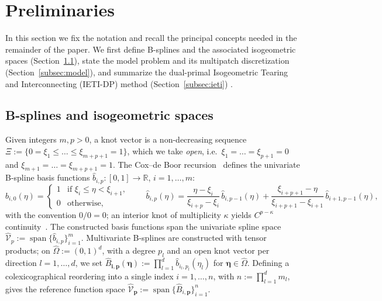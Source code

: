 \documentclass{article}
\newcommand{\vect}[1]{\boldsymbol{#1}}
\newcommand{\R}{\mathbb{R}}
\DeclareMathOperator{\spann}{span}
\newcommand{\refdom}{\widehat{\Omega}}            %
\newcommand{\bsuni}[2]{\widehat{b}_{#1,#2}}      %
\newcommand{\Bref}[2]{\widehat{B}_{#1,#2}}       %
\newcommand{\Shat}[1]{\widehat{\mathcal{V}}_{#1}} %
\theoremstyle{plain}
\numberwithin{equation}{section}
\begin{document}
\section{Preliminaries} \label{sec:preliminaries}

In this section we fix the notation and recall the principal concepts needed in the
remainder of the paper. We first define B-splines and the associated
isogeometric spaces (Section~\ref{subsec:bsplines}), state the model problem and
its multipatch discretization (Section~\ref{subsec:model}), and summarize the
dual-primal Isogeometric Tearing and Interconnecting (IETI-DP) method
(Section~\ref{subsec:ieti}) \cite{kleiss2012ieti}.

\subsection{B-splines and isogeometric spaces} \label{subsec:bsplines}

Given integers $m, p > 0$, a knot vector is a non-decreasing sequence
$\Xi := \{0 = \xi_1 \le \dots \le \xi_{m+p+1} = 1\}$, which we take \emph{open},
i.e.\ $\xi_1 = \dots = \xi_{p+1} = 0$ and $\xi_{m+1} = \dots = \xi_{m+p+1} = 1$.
The Cox--de Boor recursion~\cite{de1978practical} defines the univariate B-spline
basis functions $\bsuni{i}{p} : [0,1] \to \R$, $i = 1, \dots, m$:
\begin{equation*}
    \bsuni{i}{0}(\eta) =
    \begin{cases}
        1 & \text{if } \xi_i \le \eta < \xi_{i+1}, \\
        0 & \text{otherwise},
    \end{cases}
    \qquad
    \bsuni{i}{p}(\eta) =
    \frac{\eta - \xi_i}{\xi_{i+p} - \xi_i}\, \bsuni{i}{p-1}(\eta)
    + \frac{\xi_{i+p+1} - \eta}{\xi_{i+p+1} - \xi_{i+1}}\, \bsuni{i+1}{p-1}(\eta),
\end{equation*}
with the convention $0/0 = 0$; an interior knot of multiplicity $\kappa$ yields
$C^{p-\kappa}$ continuity~\cite{cottrell2009isogeometric}. The constructed basis functions span the univariate
spline space $\Shat{p} := \spann\{\bsuni{i}{p}\}_{i=1}^{m}$.
Multivariate B-splines are constructed with tensor products; on $\refdom := (0,1)^d$,
with a degree $p_l$ and an open knot vector per direction $l = 1, \dots, d$, we
set $\Bref{\vect{i}}{\vect{p}}(\vect{\eta}) := \prod_{l=1}^{d}
    \bsuni{i_l}{p_l}(\eta_l)$ for $\vect{\eta} \in \refdom$. Defining a
colexicographical reordering into a single index $i = 1, \dots, n$, with
$n := \prod_{l=1}^{d} m_l$, gives the reference function space $\Shat{\vect{p}} :=
    \spann\{\Bref{i}{\vect{p}}\}_{i=1}^{n}$.
\end{document}
